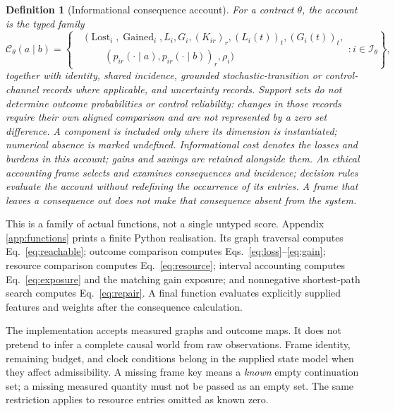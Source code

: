 \documentclass[11pt,a4paper]{article}
\newtheorem{definition}{Definition}[section]
\theoremstyle{remark}
\newcommand{\C}{\mathcal C}
\newcommand{\I}{\mathcal I}
\newcommand{\Lost}{\operatorname{Lost}}
\newcommand{\Gained}{\operatorname{Gained}}
\begin{document}
\begin{definition}[Informational consequence account]\label{def:account}
For a contract $\theta$, the account is the typed family
\begin{equation}\label{eq:account}
\C_\theta(a\mid b)=
\left\{\begin{aligned}
 &\bigl(\Lost_i,\Gained_i,L_i,G_i,(K_{ir})_r,(L_i(t))_t,(G_i(t))_t,\\
 &\qquad(p_{ir}(\cdot\mid a),p_{ir}(\cdot\mid b))_r,\rho_i\bigr)
 \end{aligned}:i\in\I_\theta\right\},
\end{equation}
together with identity, shared incidence, grounded stochastic-transition or
control-channel records where applicable, and uncertainty records.
Support sets do not determine outcome probabilities or control reliability:
changes in those records require their own aligned comparison and are not
represented by a zero set difference. A component
is included only where its dimension is instantiated; numerical absence is
marked undefined. Informational cost denotes the losses and burdens in this
account; gains and savings are retained alongside them. An ethical accounting frame
selects and examines consequences and incidence; decision rules evaluate the
account without redefining the occurrence of its entries. A frame that leaves
a consequence out does not make that consequence absent from the system.
\end{definition}

This is a family of actual functions, not a single untyped score. Appendix
\ref{app:functions} prints a finite Python realisation. Its graph traversal
computes Eq.~\eqref{eq:reachable}; outcome comparison computes
Eqs.~\eqref{eq:loss}--\eqref{eq:gain}; resource comparison computes
Eq.~\eqref{eq:resource}; interval accounting computes
Eq.~\eqref{eq:exposure} and the matching gain exposure; and nonnegative
shortest-path search computes
Eq.~\eqref{eq:repair}. A final function evaluates explicitly supplied features
and weights after the consequence calculation.

The implementation accepts measured graphs and outcome maps. It does not
pretend to infer a complete causal world from raw observations. Frame identity,
remaining budget, and clock conditions belong in the supplied state model when
they affect admissibility. A missing frame key means a \emph{known} empty
continuation set; a missing measured quantity must not be passed as an empty set.
The same restriction applies to resource entries omitted as known zero.
\end{document}
